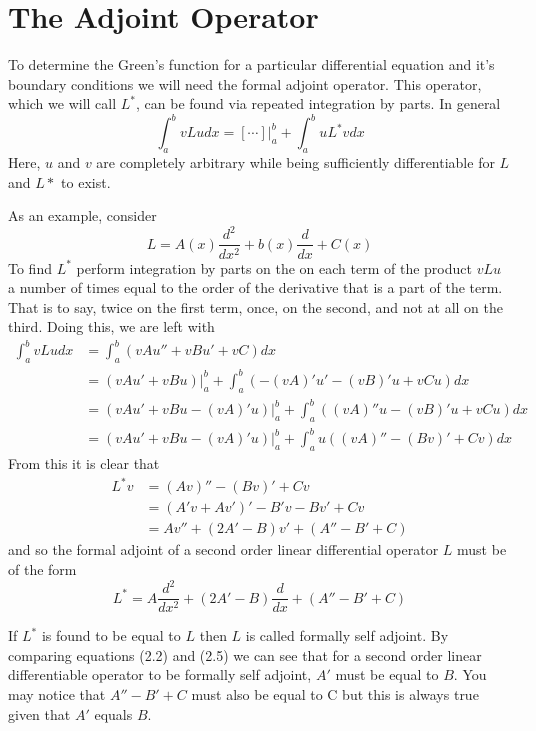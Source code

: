 \section{The Adjoint Operator}
To determine the Green's function for a particular differential equation and it's boundary conditions we will need the formal adjoint operator. This operator, which we will call \(L^*\), can be found via repeated integration by parts. In general
\begin{equation}
	\int_a^b vLu dx = [\cdots]\biggr\rvert_a^b + \int_a^b uL^*v dx
\end{equation}
Here, \(u\) and \(v\) are completely arbitrary while being sufficiently differentiable for \(L\) and \(L*\) to exist. 

As an example, consider
\begin{equation}
	L= A(x) \frac{d^2}{dx^2} + b(x)\frac{d}{dx} + C(x)
\end{equation}
To find \(L^*\) perform integration by parts on the on each term of the product \(vLu\) a number of times equal to the order of the derivative that is a part of the term. That is to say, twice on the first term, once, on the second, and not at all on the third. Doing this, we are left with
\begin{equation}
	\begin{split}
		\int_a^b vLu dx &= \int_a^b (vAu''+ vBu' + vC)dx\\
		&=(vAu'+vBu)\biggr\rvert_a^b + \int_a^b (-(vA)'u'-(vB)'u+vCu)dx\\
		&=(vAu'+vBu-(vA)'u)\biggr\rvert_a^b + \int_a^b ((vA)''u-(vB)'u+vCu)dx\\
		&=(vAu'+vBu-(vA)'u)\biggr\rvert_a^b + \int_a^b u((vA)''-(Bv)'+Cv)dx
	\end{split}
\end{equation}
From this it is clear that 
\begin{equation}
	\begin{split}
		L^*v &= (Av)''-(Bv)'+Cv\\
		     &= (A'v+Av')'-B'v-Bv'+Cv\\
		     &= Av''+(2A'-B)v'+(A''-B'+C)
	\end{split}
\end{equation}
and so the formal adjoint of a second order linear differential operator \(L\) must be of the form
\begin{equation}
	L^*=A\frac{d^2}{dx^2} + (2A'-B)\frac{d}{dx}+(A''-B'+C)
\end{equation}

If \(L^*\) is found to be equal to \(L\) then \(L\) is called formally self adjoint. By comparing equations (2.2) and (2.5) we can see that for a second order linear differentiable operator to be formally self adjoint, \(A'\) must be equal to \(B\). You may notice that \(A''-B'+C\) must also be equal to C but this is always true given that \(A'\) equals \(B\).

